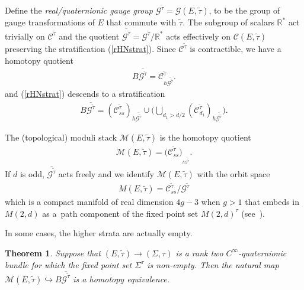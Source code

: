 \documentclass[pdftex]{sigma}
\numberwithin{equation}{section}
\newtheorem{Theorem}{Theorem}[section]
\begin{document}
Def\/ine the \emph{real/quaternionic gauge group} ${\mathcal G}^{\tilde{\tau}} = {\mathcal G}(E,\tilde{\tau})$, to be the group of gauge transformations of $E$ that commute with $\tilde{\tau}$. The subgroup of scalars ${\mathbb R}^*$ act trivially on ${\mathcal C}^{\tilde{\tau}}$ and the quotient $\overline{{\mathcal G}^{\tilde{\tau}}} = {\mathcal G}^{\tilde{\tau}}/{\mathbb R}^*$ acts ef\/fectively on ${\mathcal C}(E,\tilde{\tau})$ preserving the stratif\/ication (\ref{rHNstrat}). Since ${\mathcal C}^{\tilde{\tau}}$ is contractible, we have a homotopy quotient
\begin{gather*} B\overline{{\mathcal G}^{\tilde{\tau}}} = {\mathcal C}_{h\overline{{\mathcal G}^{\tilde{\tau}}}}^{\tilde{\tau}}.\end{gather*}
and (\ref{rHNstrat}) descends to a stratif\/ication
\begin{gather}\label{rHNstratquot} B\overline{{\mathcal G}^{\tilde{\tau}}} = ({\mathcal C}_{ss}^{\tilde{\tau}})_{h\overline{{\mathcal G}^{\tilde{\tau}}}} \cup \bigg( \bigcup_{d_1 > d/2} ({\mathcal C}_{d_1}^{\tilde{\tau}})_{h\overline{{\mathcal G}^{\tilde{\tau}}}} \bigg). \end{gather}

The (topological) moduli stack ${\mathcal M}(E,\tilde{\tau})$ is the homotopy quotient
\begin{gather*} {\mathcal M}(E,\tilde{\tau}) = \big({\mathcal C}_{ss}^{\tilde{\tau}}\big)_{_{h\overline{{\mathcal G}^{\tilde{\tau}}}}}. \end{gather*} If $d$ is odd, $\overline{{\mathcal G}^{\tilde{\tau}}}$ acts freely and we identify ${\mathcal M}(E,\tilde{\tau})$ with the orbit space \begin{gather*}M(E,\tilde{\tau}) = {\mathcal C}_{ss}^{\tilde{\tau}}/ {\mathcal G}^{\tilde{\tau}}\end{gather*} which is a compact manifold of real dimension $4g-3$ when $g>1$ that embeds in $M(2,d)$ as a~path component of the f\/ixed point set $M(2,d)^{\tau}$ (see~\cite{S12}).

In some cases, the higher strata are actually empty.

\begin{Theorem}\label{QuatDone}
Suppose that $(E,\tilde{\tau}) \rightarrow (\Sigma, \tau)$ is a rank two $C^{\infty}$-quaternionic bundle for which the fixed point set $\Sigma^{\tau}$ is non-empty. Then the natural map $ {\mathcal M}(E,\tilde{\tau}) \hookrightarrow B\overline{{\mathcal G}^{\tilde{\tau}}} $ is a homotopy equivalence.
\end{Theorem}
\end{document}

